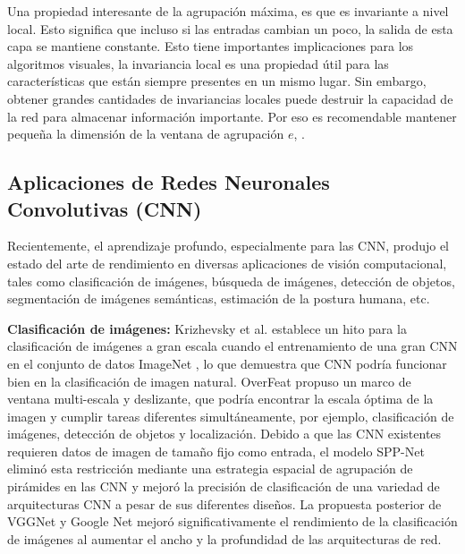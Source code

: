 	Una propiedad interesante de la agrupación máxima, es que es invariante a nivel local. Esto significa que incluso si las entradas cambian un poco, la salida de esta capa se mantiene constante. Esto tiene importantes implicaciones para los algoritmos visuales, la invariancia local es una propiedad útil para las características que están siempre presentes en un mismo lugar. Sin embargo, obtener grandes cantidades de invariancias locales puede destruir la capacidad de la red para almacenar información importante. Por eso es recomendable mantener pequeña la dimensión de la ventana de agrupación $e$, \cite{dlBook}.
	
\subsection {Aplicaciones de   {Redes Neuronales Convolutivas (CNN)}}

Recientemente, el aprendizaje profundo, especialmente para las CNN, produjo el estado del arte de rendimiento en diversas aplicaciones de visión computacional, tales como clasificación de imágenes, búsqueda de imágenes, detección de objetos, segmentación de imágenes semánticas, estimación de la postura humana, etc.

\textbf{Clasificación de imágenes:} Krizhevsky et al. \cite{Krizhevsky} establece un hito para la clasificación de imágenes a gran escala cuando el entrenamiento de una gran CNN en el conjunto de datos ImageNet \cite{Deng}, lo que demuestra que CNN podría funcionar bien en la clasificación de imagen natural. OverFeat \cite{Sermanet} propuso un marco de ventana multi-escala y deslizante, que podría encontrar la escala óptima de la imagen y cumplir tareas diferentes simultáneamente, por ejemplo, clasificación de imágenes, detección de objetos y localización. Debido a que las CNN existentes requieren datos de imagen de tamaño fijo como entrada, el modelo SPP-Net eliminó esta restricción mediante una estrategia espacial de agrupación de pirámides en las CNN y mejoró la precisión de clasificación de una variedad de arquitecturas CNN a pesar de sus diferentes diseños.  La propuesta posterior de VGGNet \cite{Simonyan} y Google Net \cite{Szegedy} mejoró significativamente el rendimiento de la clasificación de imágenes al aumentar el ancho y la profundidad de las arquitecturas de red.

